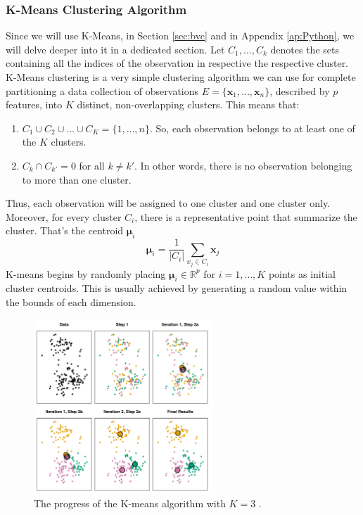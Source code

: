 \subsubsection{K-Means Clustering Algorithm}
\label{sss:kmeans}
Since we will use K-Means, in Section \ref{sec:bvc} and in Appendix \ref{ap:Python}, we will delve deeper into it in a dedicated section. Let $C_1,\dots,C_k$ denotes the sets containing all the indices of the observation in respective the respective cluster. K-Means clustering is a very simple clustering algorithm we can use for complete partitioning a data collection of observations $E=\{\mathbf{x}_1, \dots, \mathbf{x}_n \}$, described by $p$ features, into $K$ distinct, non-overlapping clusters. This means that:
\begin{enumerate}
    \item $C_1 \cup C_2 \cup \dots \cup C_K=\{1,\dots,n\}$. So, each observation belongs to at least one of the $K$ clusters.
    \item $C_k\cap C_{k'}=0$ for all $k\neq k'$. In other words, there is no observation belonging to more than one cluster.
\end{enumerate}
Thus, each observation will be assigned to one cluster and one cluster only. Moreover, for every cluster $C_i$, there is a representative point that summarize the cluster. That's the centroid $\bm{\mu}_i$
\begin{equation}
    \label{eq:centroid}
    \boldsymbol{\mu}_i=\frac{1}{\left|C_i\right|} \sum_{x_j \in C_i} \mathbf{x}_j
\end{equation}
K-means begins by randomly placing $\bm{\mu}_i \in \mathbb{R}^p$ for $i=1,\dots,K$ points as initial cluster centroids. This is usually achieved by generating a random value within the bounds of each dimension. 
\begin{figure}
    \centering
    \includegraphics[width=0.6\textwidth]{Images/clustiteration.png}
    \caption[K-Means clustering iterations.]{The progress of the K-means algorithm with $K=3$ \cite{james_introduction_2021}.}
    \label{fig:clustiteration}
\end{figure}
